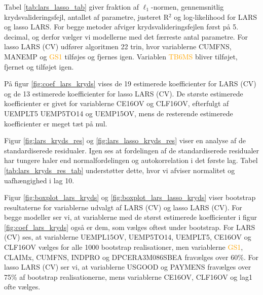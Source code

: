 
Tabel \ref{tab:lars_lasso_tab} giver fraktion af \(\ell_1\)-normen, gennemsnitlig krydsvalideringsfejl, antallet af parametre, justeret R$^2$ og log-likelihood for LARS og lasso LARS.
For begge metoder afviger krydsvalideringsfejlen først på 5. decimal, og derfor vælger vi modellerne med det færreste antal parametre. 
For lasso LARS (CV) udfører algoritmen 22 trin, hvor variablerne  \textcolor{chartreuse4}{CUMFNS}, \textcolor{blue3}{MANEMP} og \textcolor{orange}{GS1} tilføjes og fjernes igen. 
Variablen \textcolor{orange}{TB6MS} bliver tilføjet, fjernet og tilføjet igen.  

%

%
På figur \ref{fig:coef_lars_kryds} vises de 19 estimerede koefficienter for LARS (CV) og de 13 estimerede koefficienter for lasso LARS (CV). 
De største estimerede koefficienter er givet for variablerne \textcolor{blue3}{CE16OV} og \textcolor{blue3}{CLF16OV}, efterfulgt af \textcolor{blue3}{UEMPLT5} \textcolor{blue3}{UEMP5TO14} og \textcolor{blue3}{UEMP15OV}, mens de resterende estimerede koefficienter er meget tæt på nul.



Figur \ref{fig:lars_kryds_res} og \ref{fig:lars_lasso_kryds_res} viser en analyse af de standardiserede residualer.
Igen ses at fordelingen af de standardiserede residualer har tungere haler end normalfordelingen og autokorrelation i det første lag. 
Tabel \ref{tab:lars_kryds_res_tab} understøtter dette, hvor vi afviser normalitet og uafhængighed i lag 10. 

Figur \ref{fig:boxplot_lars_kryds} og \ref{fig:boxplot_lars_lasso_kryds} viser bootstrap resultaterne for variablerne udvalgt af LARS (CV) og lasso LARS (CV). 
For begge modeller ser vi, at variablerne med de størst estimerede koefficienter i figur \ref{fig:coef_lars_kryds} også er dem, som vælges oftest under bootstrap. 
For LARS (CV) ses, at variablerne \textcolor{blue3}{UEMPL15OV}, \textcolor{blue3}{UEMP5TO14}, \textcolor{blue3}{UEMPLT5}, \textcolor{blue3}{CE16OV} og \textcolor{blue3}{CLF16OV} vælges for alle 1000 bootstrap realisationer, men variablerne \textcolor{orange}{GS1}, \textcolor{blue3}{CLAIMx}, \textcolor{chartreuse4}{CUMFNS}, \textcolor{chartreuse4}{INDPRO} og \textcolor{red3}{DPCERA3M086SBEA} fravælges over 60\%.
For lasso LARS (CV) ser vi, at variablerne \textcolor{blue3}{USGOOD} og \textcolor{blue3}{PAYMENS} fravælges over 75\% af bootstrap realisationerne, mens variablerne \textcolor{blue3}{CE16OV}, \textcolor{blue3}{CLF16OV} og \textcolor{blue3}{lag1} ofte vælges. 

